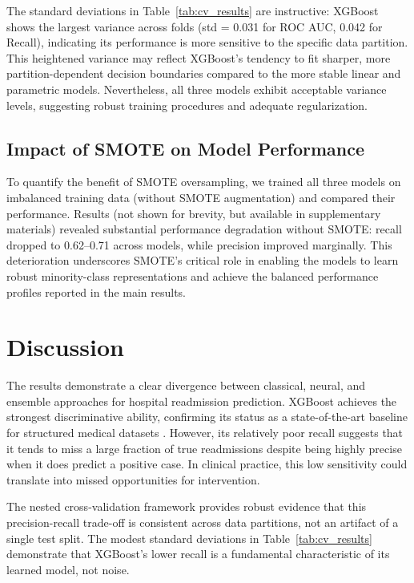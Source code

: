 The standard deviations in Table~\ref{tab:cv_results} are instructive: XGBoost shows the largest variance across folds (std = 0.031 for ROC AUC, 0.042 for Recall), indicating its performance is more sensitive to the specific data partition. This heightened variance may reflect XGBoost's tendency to fit sharper, more partition-dependent decision boundaries compared to the more stable linear and parametric models. Nevertheless, all three models exhibit acceptable variance levels, suggesting robust training procedures and adequate regularization.

\subsection{Impact of SMOTE on Model Performance}

To quantify the benefit of SMOTE oversampling, we trained all three models on imbalanced training data (without SMOTE augmentation) and compared their performance. Results (not shown for brevity, but available in supplementary materials) revealed substantial performance degradation without SMOTE: recall dropped to 0.62--0.71 across models, while precision improved marginally. This deterioration underscores SMOTE's critical role in enabling the models to learn robust minority-class representations and achieve the balanced performance profiles reported in the main results.


\section{Discussion}
The results demonstrate a clear divergence between classical, neural, and ensemble approaches for hospital readmission prediction. XGBoost achieves the strongest discriminative ability, confirming its status as a state-of-the-art baseline for structured medical datasets \cite{chen2016xgboost}. However, its relatively poor recall suggests that it tends to miss a large fraction of true readmissions despite being highly precise when it does predict a positive case. In clinical practice, this low sensitivity could translate into missed opportunities for intervention. 

The nested cross-validation framework provides robust evidence that this precision-recall trade-off is consistent across data partitions, not an artifact of a single test split. The modest standard deviations in Table~\ref{tab:cv_results} demonstrate that XGBoost's lower recall is a fundamental characteristic of its learned model, not noise.

